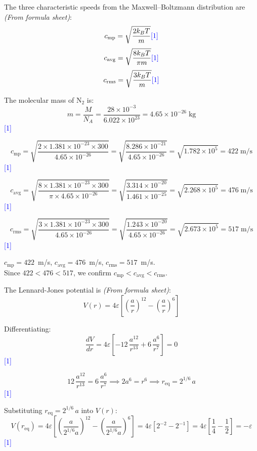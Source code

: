 \documentclass[12pt,a4paper]{article}
\newcommand{\markstep}[1]{\hfill\textcolor{blue}{[#1]}}
\newcommand{\finalanswer}[1]{%
  \begin{tcolorbox}[colback=green!5!white,colframe=green!50!black,boxrule=0.5pt]
  #1
  \end{tcolorbox}
}
\newcommand{\fromsheet}{\textit{(From formula sheet)}}
\begin{document}
\begin{parts}
\item The three characteristic speeds from the Maxwell--Boltzmann distribution are \fromsheet:
\[
c_\mathrm{mp} = \sqrt{\frac{2k_B T}{m}} \markstep{1}
\]
\[
c_\mathrm{avg} = \sqrt{\frac{8k_B T}{\pi m}} \markstep{1}
\]
\[
c_\mathrm{rms} = \sqrt{\frac{3k_B T}{m}} \markstep{1}
\]

\item The molecular mass of N$_2$ is:
\[
m = \frac{M}{N_A} = \frac{28 \times 10^{-3}}{6.022 \times 10^{23}} = 4.65 \times 10^{-26}\;\text{kg}
\]
\markstep{1}

\[
c_\mathrm{mp} = \sqrt{\frac{2 \times 1.381 \times 10^{-23} \times 300}{4.65 \times 10^{-26}}} = \sqrt{\frac{8.286 \times 10^{-21}}{4.65 \times 10^{-26}}} = \sqrt{1.782 \times 10^5} = 422\;\text{m/s}
\]
\markstep{1}

\[
c_\mathrm{avg} = \sqrt{\frac{8 \times 1.381 \times 10^{-23} \times 300}{\pi \times 4.65 \times 10^{-26}}} = \sqrt{\frac{3.314 \times 10^{-20}}{1.461 \times 10^{-25}}} = \sqrt{2.268 \times 10^5} = 476\;\text{m/s}
\]
\markstep{1}

\[
c_\mathrm{rms} = \sqrt{\frac{3 \times 1.381 \times 10^{-23} \times 300}{4.65 \times 10^{-26}}} = \sqrt{\frac{1.243 \times 10^{-20}}{4.65 \times 10^{-26}}} = \sqrt{2.673 \times 10^5} = 517\;\text{m/s}
\]
\markstep{1}

\finalanswer{$c_\mathrm{mp} = 422$~m/s, \quad $c_\mathrm{avg} = 476$~m/s, \quad $c_\mathrm{rms} = 517$~m/s. \\
Since $422 < 476 < 517$, we confirm $c_\mathrm{mp} < c_\mathrm{avg} < c_\mathrm{rms}$.}

\item The Lennard-Jones potential is \fromsheet:
\[
V(r) = 4\varepsilon\left[\left(\frac{a}{r}\right)^{12} - \left(\frac{a}{r}\right)^{6}\right]
\]

Differentiating:
\[
\frac{dV}{dr} = 4\varepsilon\left[-12\,\frac{a^{12}}{r^{13}} + 6\,\frac{a^{6}}{r^{7}}\right] = 0
\]
\markstep{1}

\[
12\,\frac{a^{12}}{r^{13}} = 6\,\frac{a^{6}}{r^{7}} \implies 2a^6 = r^6 \implies r_\mathrm{eq} = 2^{1/6}\,a
\]
\markstep{1}

Substituting $r_\mathrm{eq} = 2^{1/6}\,a$ into $V(r)$:
\[
V(r_\mathrm{eq}) = 4\varepsilon\left[\left(\frac{a}{2^{1/6}a}\right)^{12} - \left(\frac{a}{2^{1/6}a}\right)^{6}\right] = 4\varepsilon\left[2^{-2} - 2^{-1}\right] = 4\varepsilon\left[\frac{1}{4} - \frac{1}{2}\right] = -\varepsilon
\]
\markstep{1}


\end{parts}
\end{document}
